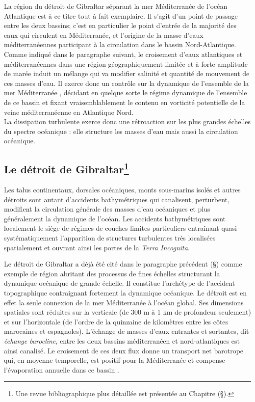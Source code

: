 La région du détroit de Gibraltar séparant la mer Méditerranée de l'océan Atlantique est à ce titre tout à fait exemplaire. Il s'agit d'un point de passage entre les deux bassins; c'est en particulier le point d'entrée de la majorité des eaux qui circulent en Méditerranée, et l'origine de la masse d'eaux méditerranéennes participant à la circulation dans le bassin Nord-Atlantique. Comme indiqué dans le paragraphe suivant, le croisement d'eaux atlantiques et méditerranéennes dans une région géographiquement limitée et à forte amplitude de marée induit un mélange qui va modifier salinité et quantité de mouvement de ces masses d'eau. Il exerce donc un contrôle sur la dynamique de l'ensemble de la mer Méditerranée \citep{FA1988}, décidant en quelque sorte le régime dynamique de l'ensemble de ce bassin et fixant vraisemblablement le contenu en vorticité potentielle de la veine méditerranéenne en Atlantique Nord.\\


La dissipation turbulente exerce donc une rétroaction sur les plus grandes échelles du spectre océanique : elle  structure les masses d'eau mais aussi la circulation océanique.

\subsection{Le détroit de Gibraltar\protect\footnote{\color{red}Une revue bibliographique plus détaillée est présentée au Chapitre  (\S {}).}}

Les talus continentaux, dorsales océaniques, monts sous-marins isolés et autres détroits sont autant d'accidents bathymétriques qui canalisent, perturbent, modifient la circulation générale des masses d'eau océaniques et plus généralement la dynamique de l'océan. Les accidents bathymétriques sont localement le siège de régimes de couches limites particuliers entraînant quasi-systématiquement l'apparition de structures turbulentes très localisées spatialement et ouvrant ainsi les portes de la \textit{Terra Incognita}.

Le détroit de Gibraltar a déjà été cité dans le paragraphe précédent (\S {}) comme exemple de région abritant des processus de fines échelles structurant la dynamique océanique de grande échelle. Il constitue l'archétype de l'accident topographique contraignant fortement la dynamique océanique. Le détroit est en effet la seule connexion de la mer Méditerranée à l'océan global. Ses dimensions spatiales sont réduites sur la verticale (de 300 m à 1 km de profondeur seulement) et sur l'horizontale (de l'ordre de la quinzaine de kilomètres entre les côtes marocaines et espagnoles). L'échange de masses d'eaux entrantes et sortantes, dit \textit{échange barocline}, entre les deux bassins méditerranéen et nord-atlantiques est ainsi canalisé. Le croisement de ces deux flux donne un transport net barotrope qui, en moyenne temporelle, est positif pour la Méditerranée et compense l'évaporation annuelle dans ce bassin \citep{Bryden94}.

